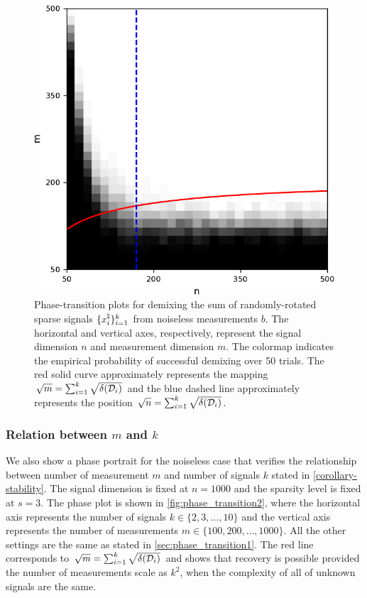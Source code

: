 \begin{figure}[t]
    \centering
    \includegraphics[width=.5\linewidth]{./figures/relation_m_n.pdf}
    \caption{Phase-transition plots for demixing the sum of randomly-rotated sparse signals $\{x_i^{\natural}\}_{i=1}^k$ from noiseless measurements $b$. The horizontal and vertical axes, respectively, represent the signal dimension $n$ and measurement dimension $m$. The colormap indicates the empirical probability of successful demixing over 50 trials. The red solid curve approximately represents the mapping $\sqrt{m} = \sum_{i=1}^k \sqrt{\delta(\mathcal{D}_i)}$ and the blue dashed line approximately represents the position $\sqrt{n} = \sum_{i=1}^k \sqrt{\delta(\mathcal{D}_i)}$.}
    \label{fig:phase_transition1}
\end{figure}

\subsubsection{Relation between $m$ and $k$}
We also show a phase portrait for the noiseless case that verifies the relationship between number of measurement $m$ and number of signals $k$ stated in \autoref{corollary-stability}. The signal dimension is fixed at $n=1000$ and the sparsity level is fixed at $s=3$. The phase plot is shown in \autoref{fig:phase_transition2}, where the horizontal axis represents the number of signals $k\in\{2, 3, \dots, 10\}$ and the vertical axis represents the number of measurements $m\in\{100, 200, \dots, 1000\}$. All the other settings are the same as stated in \autoref{sec:phase_transition1}. The red line corresponds to $\sqrt{m} = \sum_{i=1}^k \sqrt{\delta(\mathcal{D}_i)}$ and shows that recovery is possible provided the number of measurements scale as $k^2$, when the complexity of all of unknown signals are the same.

